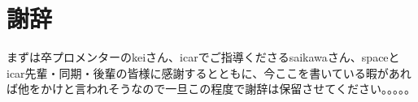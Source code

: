 \chapter*{謝辞}
まずは卒プロメンターのkeiさん、icarでご指導くださるsaikawaさん、spaceとicar先輩・同期・後輩の皆様に感謝するとともに、今ここを書いている暇があれば他をかけと言われそうなので一旦この程度で謝辞は保留させてください。。。。。
